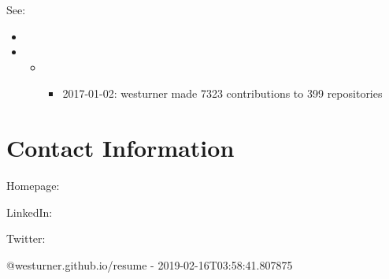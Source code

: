 \documentclass[letter,,openany,oneside,english]{sphinxhowto}
\begin{document}
See:
\begin{itemize}
\item {} 

\item {} 
\begin{itemize}
\item {} 
\begin{itemize}
\item {} 
2017-01-02: \sphinxquotedblleft{}westurner made 7323 contributions to 399 repositories\sphinxquotedblright{}

\end{itemize}

\end{itemize}

\end{itemize}


\section{Contact Information}
\label{\detokenize{resume:contact-information}}
\begin{DUlineblock}{0em}
\item[] Homepage: 
\item[] LinkedIn: 
\item[] Twitter: 
\end{DUlineblock}

@westurner.github.io/resume - 2019-02-16T03:58:41.807875

\renewcommand{\indexname}{Index}
\end{document}
